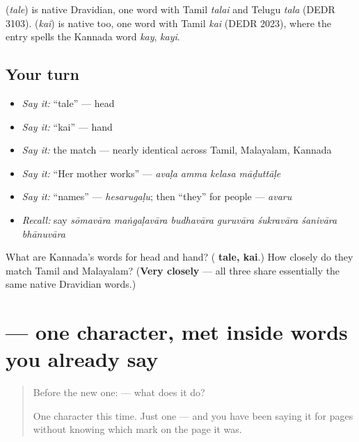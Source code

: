 \begin{cousinweb}
\textbf{} (\emph{tale}) is native Dravidian, one word with Tamil \emph{talai} and Telugu \emph{tala} (DEDR 3103). \textbf{} (\emph{kai}) is native too, one word with Tamil \emph{kai} (DEDR 2023), where the entry spells the Kannada word \emph{kay}, \emph{kayi}.
\end{cousinweb}

\subsection*{Your turn}
\begin{itemize}
\raggedright
  \item \emph{Say it:} \textquotedblleft{}tale\textquotedblright{} — head
  \item \emph{Say it:} \textquotedblleft{}kai\textquotedblright{} — hand
  \item \emph{Say it:} the match — nearly identical across Tamil, Malayalam, Kannada
  \item \emph{Say it:} “Her mother works” — \emph{avaḷa amma kelasa māḍuttāḷe}
  \item \emph{Say it:} “names” — \emph{hesarugaḷu}; then “they” for people — \emph{avaru}
  \item \emph{Recall:} say \emph{sōmavāra maṅgaḷavāra budhavāra guruvāra śukravāra śanivāra bhānuvāra}
\end{itemize}

\begin{tcolorbox}[breakable,colback=teal!4,colframe=teal!35!black,title={Before you move on}]
What are Kannada's words for head and hand? (\textbf{ tale,  kai}.) How closely do they match Tamil and Malayalam? (\textbf{Very closely} — all three share essentially the same native Dravidian words.)
\end{tcolorbox}
\section[\texorpdfstring{\kn{ಚ} (ca)}{ಚ (ca)}]{ — one character, met inside words you already say}

\label{lesson:KA-S122-letter-ca}



\begin{quote}
Before the new one:  — what does it do?

One character this time. Just one — and you have been saying it for pages without knowing which mark on the page it was.
\end{quote}

